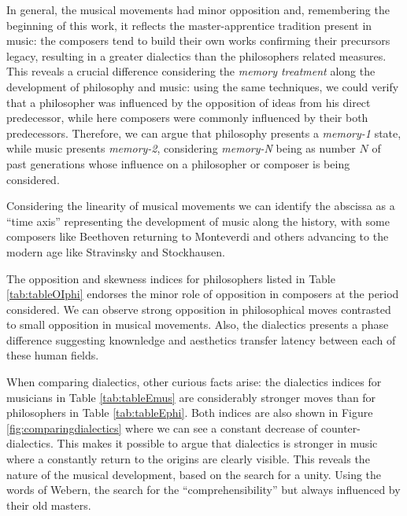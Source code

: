 \documentclass[
 aip,
 jmp,
 amsmath,amssymb,
 reprint,
]{revtex4-1}
\begin{document}
In general, the musical movements had minor opposition and,
remembering the beginning of this work, it reflects the
master-apprentice
tradition present in music: the composers tend to build their own
works confirming their precursors legacy, resulting in a greater
dialectics than the philosophers related measures.
This reveals a crucial difference
considering the \textit{memory treatment} along the development of
philosophy and music: using the same techniques,
we could verify that a philosopher was influenced by the
opposition of ideas from his direct predecessor, while here composers were commonly
influenced by their both predecessors. Therefore, we can argue that philosophy
presents a \textit{memory-1} state, while music presents
\textit{memory-2}, considering \textit{memory-N} being as number $N$
of past generations whose influence on a philosopher or
composer is being considered. 

Considering the linearity of musical movements we can
identify the abscissa as a ``time axis'' representing the development
of music along the history, with some composers
like Beethoven returning to Monteverdi and others advancing to the
modern age like Stravinsky and Stockhausen.

The opposition and skewness indices for philosophers listed in Table
\ref{tab:tableOIphi} endorses the minor role of opposition in
composers at the period considered. We can observe strong opposition
in philosophical moves contrasted to small opposition in
musical movements. Also, the dialectics presents a
phase difference suggesting knownledge and aesthetics 
transfer latency between each of these human fields.

When comparing dialectics, other curious facts arise: the dialectics
indices for musicians in Table \ref{tab:tableEmus} are considerably stronger moves than for
philosophers in Table \ref{tab:tableEphi}. Both indices are also shown in Figure
\ref{fig:comparingdialectics} where we can see a constant decrease
of counter-dialectics. This makes it possible to argue
that dialectics is stronger in music where a
constantly return to the origins are clearly visible. This reveals the nature of the
musical development, based on the search for a unity. Using the words
of Webern, the search for the ``comprehensibility'' but always
influenced by their old masters.
\end{document}
